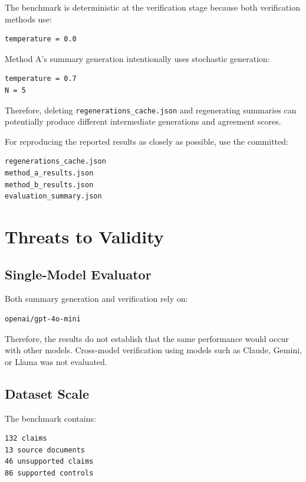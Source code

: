 \documentclass[11pt,a4paper]{article}
\begin{document}
The benchmark is deterministic at the verification stage because both verification methods use:

\begin{lstlisting}
temperature = 0.0
\end{lstlisting}

Method A's summary generation intentionally uses stochastic generation:

\begin{lstlisting}
temperature = 0.7
N = 5
\end{lstlisting}

Therefore, deleting \texttt{regenerations\_cache.json} and regenerating summaries can potentially produce different intermediate generations and agreement scores.

For reproducing the reported results as closely as possible, use the committed:

\begin{lstlisting}
regenerations_cache.json
method_a_results.json
method_b_results.json
evaluation_summary.json
\end{lstlisting}


\section{Threats to Validity}

\subsection{Single-Model Evaluator}

Both summary generation and verification rely on:

\begin{lstlisting}
openai/gpt-4o-mini
\end{lstlisting}

Therefore, the results do not establish that the same performance would occur with other models. Cross-model verification using models such as Claude, Gemini, or Llama was not evaluated.

\subsection{Dataset Scale}

The benchmark contains:

\begin{lstlisting}
132 claims
13 source documents
46 unsupported claims
86 supported controls
\end{lstlisting}
\end{document}
